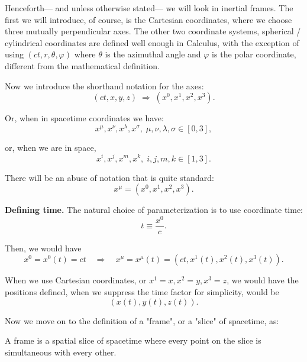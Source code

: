 \documentclass[10pt]{article}
\begin{document}
	Henceforth— and unless otherwise stated— we will look in inertial frames. The first we will introduce, of course, is the Cartesian coordinates, where we choose three mutually perpendicular axes. The other two coordinate systems, spherical / cylindrical coordinates are defined well enough in Calculus, with the exception of using $(ct,r,\theta,\varphi)$ where $\theta$ is the azimuthal angle and $\varphi$ is the polar coordinate, different from the mathematical definition.

	\vspace{1\baselineskip}
	Now we introduce the shorthand notation for the axes:
	\begin{equation}
	  (ct,x,y,z) \;\Rightarrow\; (x^{0},x^{1},x^{2},x^{3}).
	\end{equation}

	Or, when in spacetime coordinates we have:
	\begin{equation}
	  x^{\mu}, x^{\nu}, x^{\lambda}, x^{\sigma}, \;\mu,\nu,\lambda,\sigma \in [0,3],
	\end{equation}

	or, when we are in space,
	\begin{equation}
	  x^{i}, x^{j}, x^{m}, x^{k}, \; i,j,m,k \in [1,3].
	\end{equation}

	There will be an abuse of notation that is quite standard:
	\begin{equation}
	  x^{\mu} = (x^{0},x^{1},x^{2},x^{3}).
	\end{equation}

	\vspace{1\baselineskip}
	\textbf{Defining time.} The natural choice of parameterization is to use coordinate time:
	\begin{equation}
	  t \equiv \frac{x^{0}}{c}.
	\end{equation}
	
	Then, we would have
	\begin{equation}
	  x^{0} = x^{0}(t) = ct \quad \Rightarrow \quad x^{\mu} = x^{\mu}(t) = (ct, x^{1}(t),x^{2}(t),x^{3}(t)).
	\end{equation}

	When we use Cartesian coordinates, or $x^{1} = x, x^{2} = y, x^{3} = z$, we would have the positions defined, when we suppress the time factor for simplicity, would be
	\begin{equation}
	  (x(t),y(t),z(t)).
	\end{equation}

	Now we move on to the definition of a "frame", or a "slice" of spacetime, as:
	\begin{definition}
		A frame is a spatial slice of spacetime where every point on the slice is simultaneous with every other.
	\end{definition}
\end{document}
